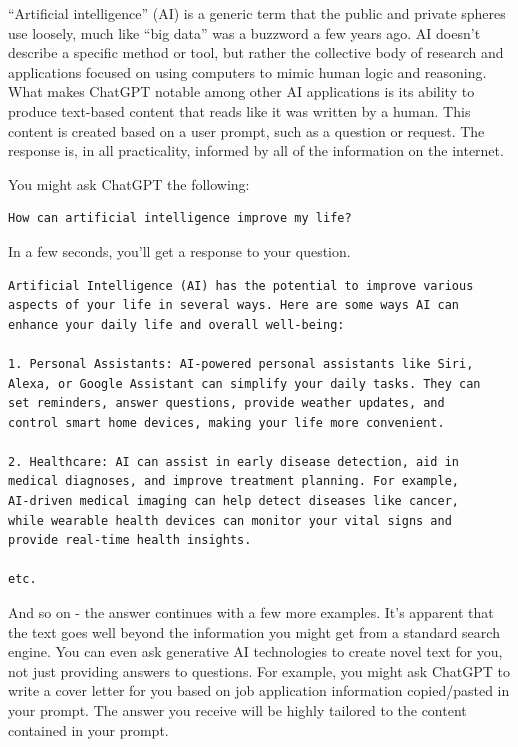 \documentclass[
]{book}
\begin{document}
``Artificial intelligence'' (AI) is a generic term that the public and private spheres use loosely, much like ``big data'' was a buzzword a few years ago. AI doesn't describe a specific method or tool, but rather the collective body of research and applications focused on using computers to mimic human logic and reasoning. What makes ChatGPT notable among other AI applications is its ability to produce text-based content that reads like it was written by a human. This content is created based on a user prompt, such as a question or request. The response is, in all practicality, informed by all of the information on the internet.

You might ask ChatGPT the following:

\begin{verbatim}
How can artificial intelligence improve my life? 
\end{verbatim}

In a few seconds, you'll get a response to your question.

\begin{verbatim}
Artificial Intelligence (AI) has the potential to improve various
aspects of your life in several ways. Here are some ways AI can 
enhance your daily life and overall well-being:

1. Personal Assistants: AI-powered personal assistants like Siri, 
Alexa, or Google Assistant can simplify your daily tasks. They can 
set reminders, answer questions, provide weather updates, and 
control smart home devices, making your life more convenient.

2. Healthcare: AI can assist in early disease detection, aid in 
medical diagnoses, and improve treatment planning. For example, 
AI-driven medical imaging can help detect diseases like cancer, 
while wearable health devices can monitor your vital signs and 
provide real-time health insights.

etc.
\end{verbatim}

And so on - the answer continues with a few more examples. It's apparent that the text goes well beyond the information you might get from a standard search engine. You can even ask generative AI technologies to create novel text for you, not just providing answers to questions. For example, you might ask ChatGPT to write a cover letter for you based on job application information copied/pasted in your prompt. The answer you receive will be highly tailored to the content contained in your prompt.
\end{document}
